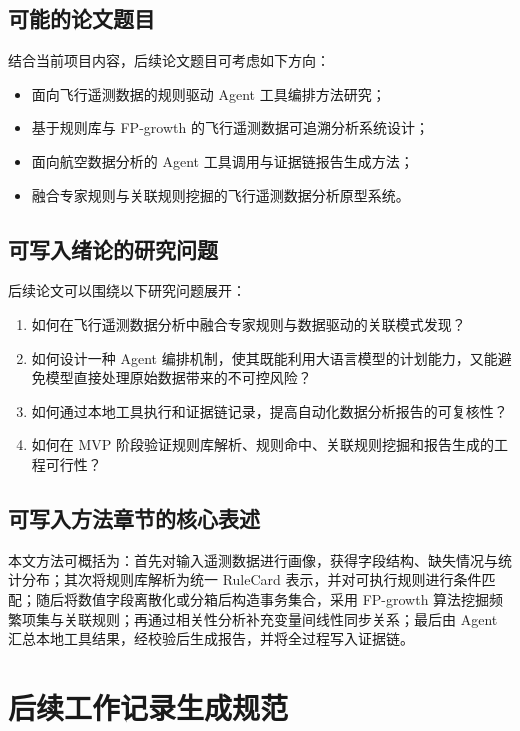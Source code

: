 \documentclass[UTF8,a4paper,zihao=-4]{ctexart}
\begin{document}
\subsection{可能的论文题目}

结合当前项目内容，后续论文题目可考虑如下方向：
\begin{itemize}
  \item 面向飞行遥测数据的规则驱动 Agent 工具编排方法研究；
  \item 基于规则库与 FP-growth 的飞行遥测数据可追溯分析系统设计；
  \item 面向航空数据分析的 Agent 工具调用与证据链报告生成方法；
  \item 融合专家规则与关联规则挖掘的飞行遥测数据分析原型系统。
\end{itemize}

\subsection{可写入绪论的研究问题}

后续论文可以围绕以下研究问题展开：
\begin{enumerate}
  \item 如何在飞行遥测数据分析中融合专家规则与数据驱动的关联模式发现？
  \item 如何设计一种 Agent 编排机制，使其既能利用大语言模型的计划能力，又能避免模型直接处理原始数据带来的不可控风险？
  \item 如何通过本地工具执行和证据链记录，提高自动化数据分析报告的可复核性？
  \item 如何在 MVP 阶段验证规则库解析、规则命中、关联规则挖掘和报告生成的工程可行性？
\end{enumerate}

\subsection{可写入方法章节的核心表述}

本文方法可概括为：首先对输入遥测数据进行画像，获得字段结构、缺失情况与统计分布；其次将规则库解析为统一 RuleCard 表示，并对可执行规则进行条件匹配；随后将数值字段离散化或分箱后构造事务集合，采用 FP-growth 算法挖掘频繁项集与关联规则；再通过相关性分析补充变量间线性同步关系；最后由 Agent 汇总本地工具结果，经校验后生成报告，并将全过程写入证据链。

\section{后续工作记录生成规范}
\end{document}
